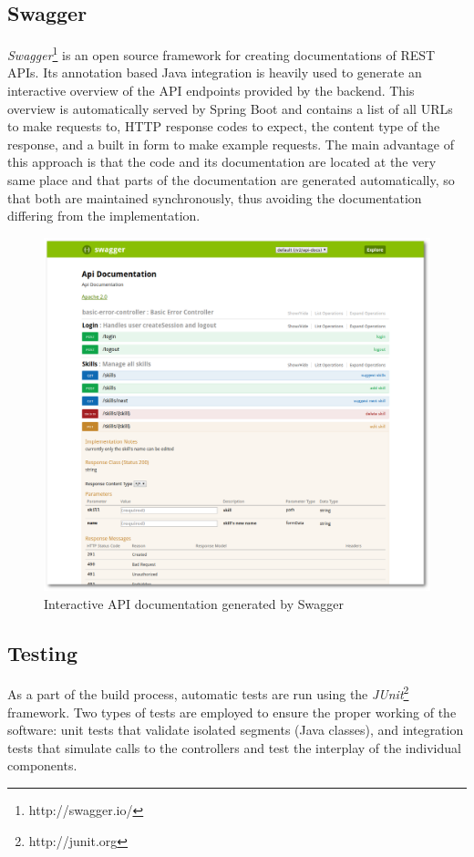 \subsection{Swagger}
\textit{Swagger}\footnote{http://swagger.io/} is an open source framework for creating documentations of REST APIs.
Its annotation based Java integration is heavily used to generate an interactive overview of the API endpoints provided by the
backend. This overview is automatically served by Spring Boot and contains a list of all URLs to make requests to, HTTP response codes to expect, the content type of the response, and a built in form to make example requests. The main advantage of this approach is that the code and its documentation are located at the very same place and that parts of the documentation are generated automatically, so that both are maintained synchronously, thus avoiding the documentation differing from the implementation.
\begin{figure}[H]
    \centering
    \includegraphics[width=\textwidth]{images/swagger_ui.png}
    \caption[Screenshot: Swagger Interactive Documentation]{Interactive API documentation generated by Swagger}
    \label{fig:markovchain}
\end{figure}

\subsection{Testing}
As a part of the build process, automatic tests are run using the \textit{JUnit}\footnote{http://junit.org} framework. Two types of tests are employed to ensure the proper working of the software: unit tests that validate isolated segments (Java classes), and integration tests that simulate calls to the controllers and test the
interplay of the individual components.

